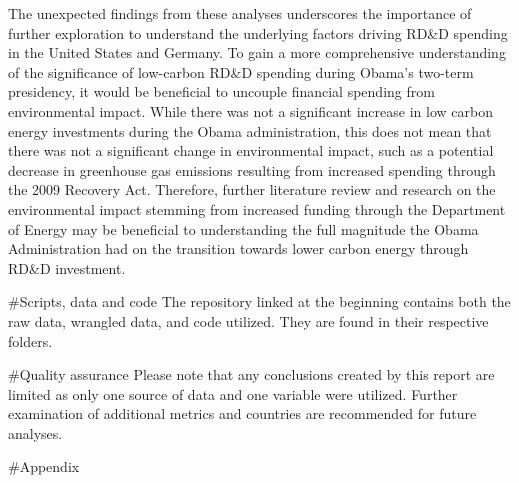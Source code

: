 \documentclass[
  12pt,
]{article}
\begin{document}
The unexpected findings from these analyses underscores the importance
of further exploration to understand the underlying factors driving
RD\&D spending in the United States and Germany. To gain a more
comprehensive understanding of the significance of low-carbon RD\&D
spending during Obama's two-term presidency, it would be beneficial to
uncouple financial spending from environmental impact. While there was
not a significant increase in low carbon energy investments during the
Obama administration, this does not mean that there was not a
significant change in environmental impact, such as a potential decrease
in greenhouse gas emissions resulting from increased spending through
the 2009 Recovery Act. Therefore, further literature review and research
on the environmental impact stemming from increased funding through the
Department of Energy may be beneficial to understanding the full
magnitude the Obama Administration had on the transition towards lower
carbon energy through RD\&D investment.

\newpage

\#Scripts, data and code The repository linked at the beginning contains
both the raw data, wrangled data, and code utilized. They are found in
their respective folders.

\#Quality assurance Please note that any conclusions created by this
report are limited as only one source of data and one variable were
utilized. Further examination of additional metrics and countries are
recommended for future analyses.

\newpage

\#Appendix
\end{document}

